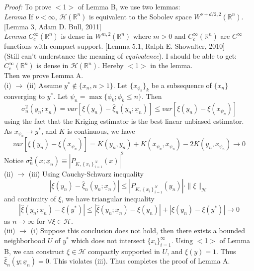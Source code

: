 \documentclass[a4paper,onecolumn]{article}
\begin{document}
\noindent \emph{Proof:} To prove $<$1$>$ of Lemma B, we use two lemmas:\\
\emph{Lemma\quad} If $\nu<\infty$, $\mathcal{H}(\mathbb{R}^n)$ is equivalent to the Sobolev space $W^{\nu+d/2,2}(\mathbb{R}^n)$. [Lemma 3, Adam D. Bull, 2011]\\
\emph{Lemma\quad } $C_c^\infty(\mathbb{R}^n)$ is dense in $W^{m,2}(\mathbb{R}^n)$ where $m>0$ and $C_c^\infty(\mathbb{R}^n)$ are $C^\infty$ functions with compact support.
[Lemma 5.1, Ralph E. Showalter, 2010]\\
(Still can't understance the meaning of \emph{equivalence}). I should be able to get:\\
$C_c^{\infty}(\mathbb{R}^n)$ is dense in $\mathcal{H}(\mathbb{R}^n)$. Hereby $<$1$>$ in the lemma.\\

\noindent Then we prove Lemma A. \\
(i) $\rightarrow$ (ii) Assume $y^*\notin \{x_n, n>1\}$. Let $\{x_{\phi_k}\}_k$ be a subsequence of $\{x_n\}$ converging to $y^*$. 
Let $\psi_n = \max \{\phi_k; \phi_k \le n\}$. Then 
$$
    \sigma_n^2(y_n; \underline{x}_n) = var\left[\xi(y_n)- \hat{\xi}_n(y_n; \underline{x}_n)\right] \le var\left[\xi(y_n) - \xi(x_{\psi_n})\right]
$$
using the fact that the Kriging estimator is the best linear unbiased estimator.\\
As $x_{\psi_n} \rightarrow y^*$, and $K$ is continuous, we have
$$
    var\left[\xi(y_n) - \xi(x_{\psi_n})\right] = K(y_n, y_n) + K(x_{\psi_n}, x_{\psi_n}) - 2 K (y_n, x_{\psi_n}) \rightarrow 0
$$
Notice $\sigma_n^2(x; \underline{x}_n) \equiv \left|P_{K, \left\{x_i\right\}_{i=1}^N} (x)\right|^2$\\

\noindent (ii) $\rightarrow$ (iii) 
Using Cauchy-Schwarz inequality
$$
    \left| \xi(y_n) - \hat{\xi}_n(y_n; \underline{x}_n) \right| \le \left|P_{K, \left\{x_i\right\}_{i=1}^N} (y_n)\right|  \cdot \|\xi\|_\mathcal{H}
$$
and continuity of $\xi$, we have triangular inequality
$$
    \left| \hat{\xi}(y_n; \underline{x}_n) - \xi(y^*) \right| \le \left| \hat{\xi}(y_n; \underline{x}_n) - \xi(y_n)\right| + \left| \xi(y_n) - \xi(y^*) \right| \rightarrow 0
$$
as $n\rightarrow \infty$ for $\forall \xi \in \mathcal{H}$.\\

\noindent (iii) $\rightarrow$ (i)
Suppose this conclusion does not hold, then there exists a bounded neighborhood $U$ of $y^*$ which does not intersect $\{x_i\}_{i=1}^\infty$. 
Using $<$1$>$ of Lemma B, we can construct $\xi\in \mathcal{H}$ compactly supported in $U$, and $\xi(y)=1$. Thus $\hat{\xi}_n(y;\underline{x}_n)=0$.
This violates (iii). Thus completes the proof of Lemma A.\\
\end{document}
